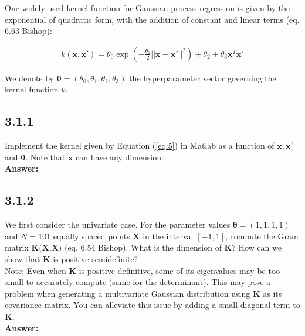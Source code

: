 \documentclass[a4paper]{article}
\begin{document}
One widely used kernel function for Gaussian process regression is given by the exponential of quadratic form, with the addition of constant and linear terms (eq. 6.63 Bishop):

\begin{eqnarray} \label{eq:5}
k(\textbf{x}, \textbf{x}') = \theta_0 \exp(- \frac{\theta_1}{2} || \textbf{x} - \textbf{x}' ||^2) + \theta_2 + \theta_3 \textbf{x}^T \textbf{x}'
\end{eqnarray}

We denote by $\boldsymbol{\theta}  = (\theta_0, \theta_1, \theta_2, \theta_3)$ the hyperparameter vector governing the kernel function $k$.

\subsection*{3.1.1}

Implement the kernel given by Equation (\ref{eq:5}) in Matlab as a function of $\textbf{x}, \textbf{x}'$ and $\boldsymbol{\theta}$. Note that $\textbf{x}$ can have any dimension.\\

\textbf{Answer:}\\





\subsection*{3.1.2}

We first consider the univariate case. For the parameter values $\boldsymbol{\theta} = (1,1,1,1)$ and $N = 101$ equally spaced points $\textbf{X}$ in the interval $[-1,1]$, compute the Gram matrix $\textbf{K(X,X)}$ (eq. 6.54 Bishop). What is the dimension of \textbf{K}? How can we show that \textbf{K} is positive semidefinite?\\

Note: Even when \textbf{K} is positive definitive, some of its eigenvalues may be too small to accurately compute (same for the determinant). This may pose a problem when generating a multivariate Gaussian distribution using \textbf{K} as its covariance matrix. You can alleviate this issue by adding a small diagonal term to \textbf{K}.\\


\textbf{Answer:}\\
\end{document}
